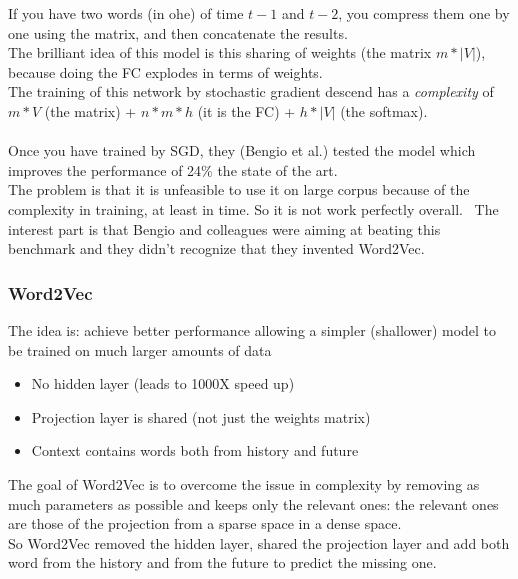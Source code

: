 If you have two words (in ohe) of time $t-1$ and $t-2$, you compress them one by one using the matrix, and then concatenate the results. \\ 


The brilliant idea of this model is this sharing of weights (the matrix $m*|V|$), because doing the FC explodes in terms of weights. \\
The training of this network by stochastic gradient descend has a \textit{complexity} of \\
$m*V$ (the matrix) + $n*m*h$ (it is the FC) + $h * |V|$ (the softmax). \\ \\

Once you have trained by SGD, they (Bengio et al.) tested the model which improves the performance of 24\% the state of the art. \\
The problem is that it is unfeasible to use it on large corpus because of the complexity in training, at least in time. So it is not work perfectly overall. \
The interest part is that Bengio and colleagues were aiming at beating this benchmark and they didn't recognize that they invented Word2Vec.

\subsubsection{Word2Vec}
The idea is: achieve better performance allowing a simpler (shallower) model to be trained on much larger amounts of data 
\begin{itemize}
    \item No hidden layer (leads to 1000X speed up)
    \item Projection layer is shared (not just the weights matrix)
    \item Context contains words both from history and future
\end{itemize}{}
The goal of Word2Vec is to overcome the issue in complexity by removing as much parameters as possible and keeps only the relevant ones: the relevant ones are those of the projection from a sparse space in a dense space. \\
So Word2Vec removed the hidden layer, shared the projection layer and add both word from the history and from the future to predict the missing one. \\

